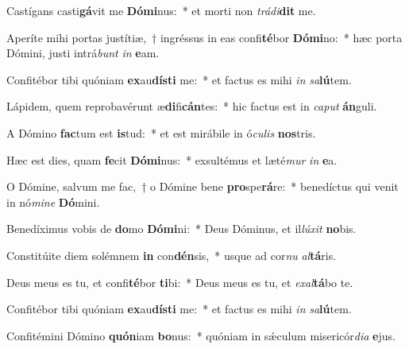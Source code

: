 \item Castígans casti\textbf{gá}vit me \textbf{Dó}\textbf{mi}nus:~* et morti non \textit{trá}\textit{di}\textbf{dit} me.
\item Aperíte mihi portas justítiæ,~† ingréssus in eas confi\textbf{té}bor \textbf{Dó}\textbf{mi}no:~* hæc porta Dómini, justi intrá\textit{bunt} \textit{in} \textbf{e}am.
\item Confitébor tibi quóniam \textbf{ex}au\textbf{dís}\textbf{ti} me:~* et factus es mihi \textit{in} \textit{sa}\textbf{lú}tem.
\item Lápidem, quem reprobavérunt æ\textbf{di}fi\textbf{cán}tes:~* hic factus est in \textit{ca}\textit{put} \textbf{án}guli.
\item A Dómino \textbf{fac}tum est \textbf{is}tud:~* et est mirábile in ó\textit{cu}\textit{lis} \textbf{nos}tris.
\item Hæc est dies, quam \textbf{fe}cit \textbf{Dó}\textbf{mi}nus:~* exsultémus et læté\textit{mur} \textit{in} \textbf{e}a.
\item O Dómine, salvum me fac,~† o Dómine bene \textbf{pro}spe\textbf{rá}re:~* benedíctus qui venit in nó\textit{mi}\textit{ne} \textbf{Dó}mini.
\item Benedíximus vobis de \textbf{do}mo \textbf{Dó}\textbf{mi}ni:~* Deus Dóminus, et il\textit{lú}\textit{xit} \textbf{no}bis.
\item Constitúite diem solémnem \textbf{in} con\textbf{dén}sis,~* usque ad cor\textit{nu} \textit{al}\textbf{tá}ris.
\item Deus meus es tu, et confi\textbf{té}bor \textbf{ti}bi:~* Deus meus es tu, et \textit{ex}\textit{al}\textbf{tá}bo te.
\item Confitébor tibi quóniam \textbf{ex}au\textbf{dís}\textbf{ti} me:~* et factus es mihi \textit{in} \textit{sa}\textbf{lú}tem.
\item Confitémini Dómino \textbf{quón}iam \textbf{bo}nus:~* quóniam in sǽculum misericór\textit{di}\textit{a} \textbf{e}jus.
